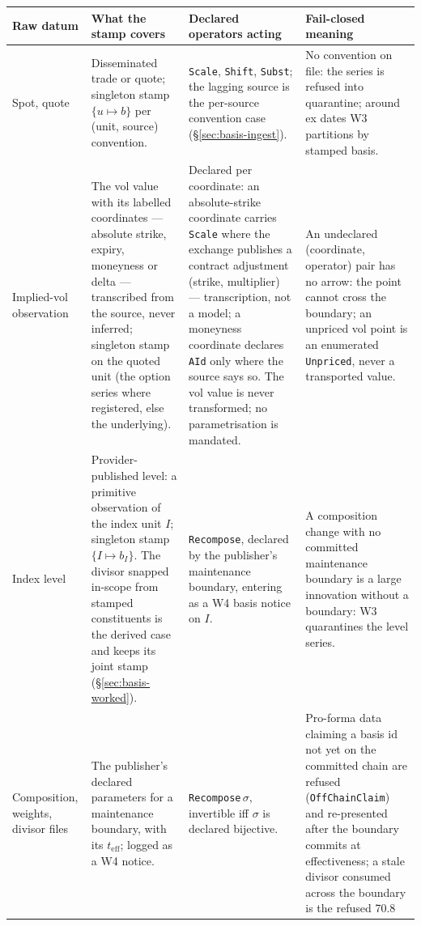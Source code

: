 \documentclass[11pt,a4paper]{article}
\begin{document}
\renewcommand{\arraystretch}{1.15}
\begin{center}
\begin{longtable}{@{}p{2.3cm} p{3.9cm} p{3.4cm} p{3.8cm}@{}}
\toprule
\textbf{Raw datum} & \textbf{What the stamp covers} & \textbf{Declared operators
acting} & \textbf{Fail-closed meaning} \\
\midrule
\endhead
Spot, quote & Disseminated trade or quote; singleton stamp $\{u\mapsto b\}$ per
(unit, source) convention. & \texttt{Scale}, \texttt{Shift}, \texttt{Subst}; the
lagging source is the per-source convention case (\S\ref{sec:basis-ingest}). & No
convention on file: the series is refused into quarantine; around ex dates W3
partitions by stamped basis. \\
\addlinespace
Implied-vol observation & The vol value with its labelled coordinates --- absolute
strike, expiry, moneyness or delta --- transcribed from the source, never inferred;
singleton stamp on the quoted unit (the option series where registered, else the
underlying). & Declared per coordinate: an absolute-strike coordinate carries
\texttt{Scale} where the exchange publishes a contract adjustment (strike,
multiplier) --- transcription, not a model; a moneyness coordinate declares
\texttt{AId} only where the source says so. The vol value is never transformed; no
parametrisation is mandated.
& An undeclared (coordinate, operator) pair has no arrow: the point cannot cross the
boundary; an unpriced vol point is an enumerated \texttt{Unpriced}, never a
transported value. \\
\addlinespace
Index level & Provider-published level: a primitive observation of the index unit
$I$; singleton stamp $\{I\mapsto b_I\}$. The divisor snapped in-scope from stamped
constituents is the derived case and keeps its joint stamp
(\S\ref{sec:basis-worked}). & \texttt{Recompose}, declared by the publisher's
maintenance boundary, entering as a W4 basis notice on $I$. & A composition change
with no committed maintenance boundary is a large innovation without a boundary: W3
quarantines the level series. \\
\addlinespace
Composition, weights, divisor files & The publisher's declared parameters for a
maintenance boundary, with its $t_{\mathrm{eff}}$; logged as a W4 notice. &
\texttt{Recompose}\,$\sigma$, invertible iff $\sigma$ is declared bijective. &
Pro-forma data claiming a basis id not yet on the committed chain are refused
(\texttt{OffChainClaim}) and re-presented after the boundary commits at
effectiveness; a stale divisor consumed across the boundary is the refused 70.8

\end{longtable}
\end{center}
\end{document}
